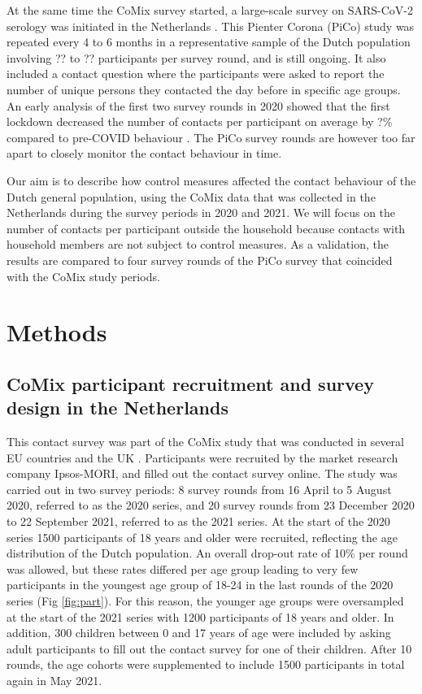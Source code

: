 \documentclass[fleqn,10pt]{wlscirep}
\begin{document}
At the same time the CoMix survey started, a large-scale survey on SARS-CoV-2 serology was initiated in the Netherlands \cite{Vos_2021}. This Pienter Corona (PiCo) study was repeated every 4 to 6 months in a representative sample of the Dutch population involving ?? to ?? participants per survey round, and is still ongoing. It also included a contact question where the participants were asked to report the number of unique persons they contacted the day before in specific age groups. An early analysis of the first two survey rounds in 2020 showed that the first lockdown decreased the number of contacts per participant on average by ?\% compared to pre-COVID behaviour \cite{Backer_2021}. The PiCo survey rounds are however too far apart to closely monitor the contact behaviour in time.

Our aim is to describe how control measures affected the contact behaviour of the Dutch general population, using the CoMix data that was collected in the Netherlands during the survey periods in 2020 and 2021. We will focus on the number of contacts per participant outside the household because contacts with household members are not subject to control measures. As a validation, the results are compared to four survey rounds of the PiCo survey that coincided with the CoMix study periods.


\section*{Methods}

\subsection*{CoMix participant recruitment and survey design in the Netherlands}

This contact survey was part of the CoMix study that was conducted in several EU countries and the UK \cite{Verelst_2021}. Participants were recruited by the market research company Ipsos-MORI, and filled out the contact survey online. The study was carried out in two survey periods: 8 survey rounds from 16 April to 5 August 2020, referred to as the 2020 series, and 20 survey rounds from 23 December 2020 to 22 September 2021, referred to as the 2021 series. At the start of the 2020 series 1500 participants of 18 years and older were recruited, reflecting the age distribution of the Dutch population. An overall drop-out rate of 10\% per round was allowed, but these rates differed per age group leading to very few participants in the youngest age group of 18-24 in the last rounds of the 2020 series (Fig \ref{fig:part}). For this reason, the younger age groups were oversampled at the start of the 2021 series with 1200 participants of 18 years and older. In addition, 300 children between 0 and 17 years of age were included by asking adult participants to fill out the contact survey for one of their children. After 10 rounds, the age cohorts were supplemented to include 1500 participants in total again in May 2021.
\end{document}
